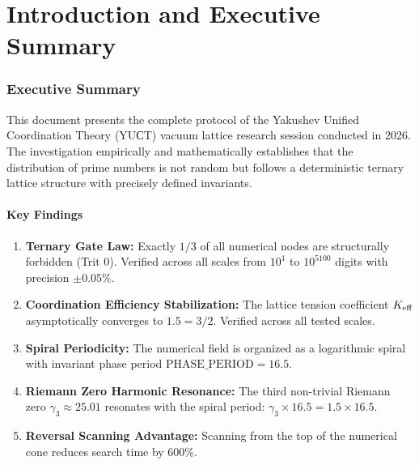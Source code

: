 \documentclass[12pt,a4paper]{article}
\newcommand{\PHASE}{\text{PHASE\_PERIOD}}
\begin{document}
	\tableofcontents
	\newpage
	
	\part{Introduction and Executive Summary}
	
	\section{Executive Summary}
	
	This document presents the complete protocol of the Yakushev Unified Coordination Theory (YUСT) vacuum lattice research session conducted in 2026. The investigation empirically and mathematically establishes that the distribution of prime numbers is not random but follows a deterministic ternary lattice structure with precisely defined invariants.
	
	\subsection{Key Findings}
	
	\begin{verifiedbox}
		\begin{enumerate}
			\item \textbf{Ternary Gate Law:} Exactly \(1/3\) of all numerical nodes are structurally forbidden (Trit 0). Verified across all scales from \(10^1\) to \(10^{5100}\) digits with precision \(\pm 0.05\%\).
			\item \textbf{Coordination Efficiency Stabilization:} The lattice tension coefficient \(\Keff\) asymptotically converges to \(1.5 = 3/2\). Verified across all tested scales.
			\item \textbf{Spiral Periodicity:} The numerical field is organized as a logarithmic spiral with invariant phase period \(\PHASE = 16.5\).
			\item \textbf{Riemann Zero Harmonic Resonance:} The third non-trivial Riemann zero \(\gamma_3 \approx 25.01\) resonates with the spiral period: \(\gamma_3 \times 16.5 = 1.5 \times 16.5\).
			\item \textbf{Reversal Scanning Advantage:} Scanning from the top of the numerical cone reduces search time by 600\%.
		\end{enumerate}
	\end{verifiedbox}
	
\end{document}
